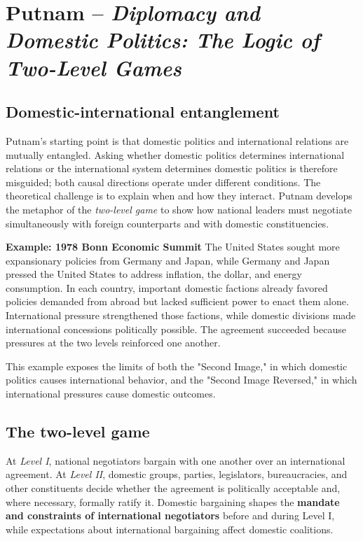 \clearpage
\section{Putnam -- \emph{Diplomacy and Domestic Politics: The Logic of Two-Level Games}}

\subsection{Domestic-international entanglement}

Putnam's starting point is that domestic politics and international relations are mutually entangled. Asking whether domestic politics determines international relations or the international system determines domestic politics is therefore misguided; both causal directions operate under different conditions. The theoretical challenge is to explain when and how they interact. Putnam develops the metaphor of the \emph{two-level game} to show how national leaders must negotiate simultaneously with foreign counterparts and with domestic constituencies.

\textbf{Example: 1978 Bonn Economic Summit} 
The United States sought more expansionary policies from Germany and Japan, while Germany and Japan pressed the United States to address inflation, the dollar, and energy consumption. In each country, important domestic factions already favored policies demanded from abroad but lacked sufficient power to enact them alone. International pressure strengthened those factions, while domestic divisions made international concessions politically possible. The agreement succeeded because pressures at the two levels reinforced one another.

This example exposes the limits of both the "Second Image," in which domestic politics causes international behavior, and the "Second Image Reversed," in which international pressures cause domestic outcomes.

\subsection{The two-level game}

At \emph{Level I}, national negotiators bargain with one another over an international agreement. At \emph{Level II}, domestic groups, parties, legislators, bureaucracies, and other constituents decide whether the agreement is politically acceptable and, where necessary, formally ratify it. Domestic bargaining shapes the \textbf{mandate and constraints of international negotiators} before and during Level I, while expectations about international bargaining affect domestic coalitions.

